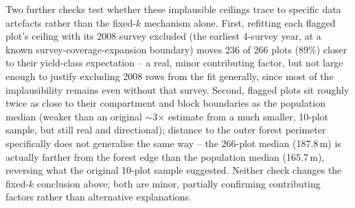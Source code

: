\documentclass[logo,msc,ai]{infthesis}           %
\begin{document}
Two further checks test whether these implausible ceilings trace to specific data artefacts rather than the fixed-$k$ mechanism alone. First, refitting each flagged plot's ceiling with its 2008 survey excluded (the earliest 4-survey year, at a known survey-coverage-expansion boundary) moves 236 of 266 plots (89\%) closer to their yield-class expectation -- a real, minor contributing factor, but not large enough to justify excluding 2008 rows from the fit generally, since most of the implausibility remains even without that survey. Second, flagged plots sit roughly twice as close to their compartment and block boundaries as the population median (weaker than an original $\sim$3$\times$ estimate from a much smaller, 10-plot sample, but still real and directional); distance to the outer forest perimeter specifically does not generalise the same way -- the 266-plot median (187.8\,m) is actually farther from the forest edge than the population median (165.7\,m), reversing what the original 10-plot sample suggested. Neither check changes the fixed-$k$ conclusion above; both are minor, partially confirming contributing factors rather than alternative explanations.
\end{document}
